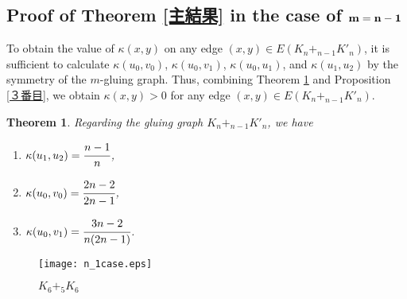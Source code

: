 \documentclass[leqno,12pt]{amsart} %
\theoremstyle{plain} %
\newtheorem{theorem}{\indent\sc Theorem}[section] %
\theoremstyle{definition} %
\begin{document}
\subsection{Proof of Theorem \ref{主結果} in the case of $\bf m=n-1$}
To obtain the value of $\kappa(x, y)$ on any edge $(x, y) \in E(K_{n} +_{n-1} K'_{n})$, it is sufficient to calculate $\kappa(u_0, v_0)$, $\kappa(u_0,v_1)$, $\kappa(u_0,u_1)$, and $\kappa(u_1, u_2)$ by the symmetry of the $m$-gluing graph. Thus, combining Theorem \ref{n-1の場合のRicci曲率} and Proposition \ref{３番目}, we obtain $\kappa(x, y) > 0$ for any edge $(x, y) \in E(K_{n} +_{n-1} K'_{n})$.
\begin{theorem}
\label{n-1の場合のRicci曲率}
Regarding the gluing graph $K_{n} +_{n-1} K'_{n}$, we have
\begin{enumerate}\rm 
\item $\kappa(u_1, u_2) = \cfrac{n-1}{n}$,
\item $\kappa(u_0,v_0) = \cfrac{2n-2}{2n-1}$,
\item $\kappa(u_0, v_1) = \cfrac{3n - 2}{n(2n-1)}$.
\end{enumerate}
\end{theorem}
  \begin{figure}[h]
     \label{glue} %
     \begin{center} 
     \texttt{[image: n\_1case.eps]}
     \caption{$K_{6} +_{5} K_{6}$}
     \end{center}
    \end{figure}
\end{document}
